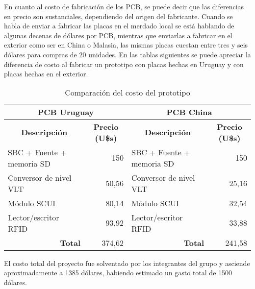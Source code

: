 En cuanto al costo de fabricación de los PCB, se puede decir
que las diferencias en precio son sustanciales, dependiendo
del origen del fabricante. 
Cuando se habla de enviar a fabricar las placas en el merdado
local se está hablando de algunas decenas de dólares por PCB, 
mientras que enviarlas a fabricar en el exterior como ser en 
China o Malasia, las mismas placas cuestan entre tres y seis 
dólares para compras de 20 unidades. En las tablas siguientes
se puede apreciar la diferencia de costo al fabricar un prototipo
con placas hechas en Uruguay y con placas hechas en el exterior.
\begin{table}[htbp]
\begin{tabular}{|l|r|l|r|}
\hline
\multicolumn{ 2}{|c|}{PCB Uruguay} & \multicolumn{ 2}{c|}{PCB China} \\ \hline
\multicolumn{1}{|c|}{\textbf{Descripción }} & \multicolumn{1}{c|}{\textbf{Precio (U\$s)}} & \multicolumn{1}{c|}{\textbf{Descripción }} & \multicolumn{1}{c|}{\textbf{Precio (U\$s)}} \\ \hline
SBC + Fuente + memoria SD & 150 & SBC + Fuente + memoria SD & 150 \\ \hline
Conversor de nivel VLT & 50,56 & Conversor de nivel VLT & 25,16 \\ \hline
Módulo SCUI & 80,14 & Módulo SCUI & 32,54 \\ \hline
Lector/escritor RFID & 93,92 & Lector/escritor RFID & 33,88 \\ \hline
\multicolumn{1}{|r|}{\textbf{Total}} & 374,62 & \multicolumn{1}{r|}{\textbf{Total}} & 241,58 \\ \hline
\end{tabular}
\caption{Comparación del costo del prototipo}
\label{}
\end{table}

El costo total del proyecto fue solventado por los integrantes
del grupo y asciende aproximadamente a 1385 dólares, habiendo 
estimado un gasto total de 1500 dólares.